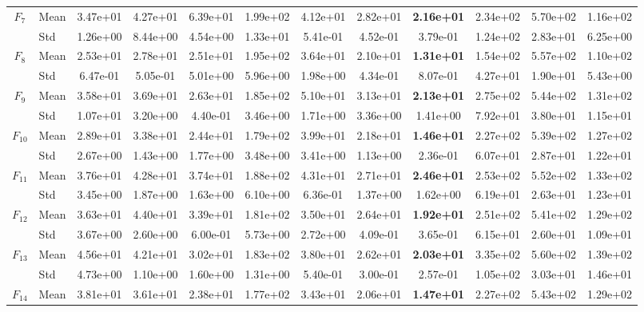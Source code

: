 \begin{center}
\begin{longtable}{clcccccccccc}
\midrule
$F_{7}$ & Mean & 3.47e+01 & 4.27e+01 & 6.39e+01 & 1.99e+02 & 4.12e+01 & 2.82e+01 & \textbf{2.16e+01} & 2.34e+02 & 5.70e+02 & 1.16e+02 \\
 & Std & 1.26e+00 & 8.44e+00 & 4.54e+00 & 1.33e+01 & 5.41e-01 & 4.52e-01 & 3.79e-01 & 1.24e+02 & 2.83e+01 & 6.25e+00 \\
\midrule
$F_{8}$ & Mean & 2.53e+01 & 2.78e+01 & 2.51e+01 & 1.95e+02 & 3.64e+01 & 2.10e+01 & \textbf{1.31e+01} & 1.54e+02 & 5.57e+02 & 1.10e+02 \\
 & Std & 6.47e-01 & 5.05e-01 & 5.01e+00 & 5.96e+00 & 1.98e+00 & 4.34e-01 & 8.07e-01 & 4.27e+01 & 1.90e+01 & 5.43e+00 \\
\midrule
$F_{9}$ & Mean & 3.58e+01 & 3.69e+01 & 2.63e+01 & 1.85e+02 & 5.10e+01 & 3.13e+01 & \textbf{2.13e+01} & 2.75e+02 & 5.44e+02 & 1.31e+02 \\
 & Std & 1.07e+01 & 3.20e+00 & 4.40e-01 & 3.46e+00 & 1.71e+00 & 3.36e+00 & 1.41e+00 & 7.92e+01 & 3.80e+01 & 1.15e+01 \\
\midrule
$F_{10}$ & Mean & 2.89e+01 & 3.38e+01 & 2.44e+01 & 1.79e+02 & 3.99e+01 & 2.18e+01 & \textbf{1.46e+01} & 2.27e+02 & 5.39e+02 & 1.27e+02 \\
 & Std & 2.67e+00 & 1.43e+00 & 1.77e+00 & 3.48e+00 & 3.41e+00 & 1.13e+00 & 2.36e-01 & 6.07e+01 & 2.87e+01 & 1.22e+01 \\
\midrule
$F_{11}$ & Mean & 3.76e+01 & 4.28e+01 & 3.74e+01 & 1.88e+02 & 4.31e+01 & 2.71e+01 & \textbf{2.46e+01} & 2.53e+02 & 5.52e+02 & 1.33e+02 \\
 & Std & 3.45e+00 & 1.87e+00 & 1.63e+00 & 6.10e+00 & 6.36e-01 & 1.37e+00 & 1.62e+00 & 6.19e+01 & 2.63e+01 & 1.23e+01 \\
\midrule
$F_{12}$ & Mean & 3.63e+01 & 4.40e+01 & 3.39e+01 & 1.81e+02 & 3.50e+01 & 2.64e+01 & \textbf{1.92e+01} & 2.51e+02 & 5.41e+02 & 1.29e+02 \\
 & Std & 3.67e+00 & 2.60e+00 & 6.00e-01 & 5.73e+00 & 2.72e+00 & 4.09e-01 & 3.65e-01 & 6.15e+01 & 2.60e+01 & 1.09e+01 \\
\midrule
$F_{13}$ & Mean & 4.56e+01 & 4.21e+01 & 3.02e+01 & 1.83e+02 & 3.80e+01 & 2.62e+01 & \textbf{2.03e+01} & 3.35e+02 & 5.60e+02 & 1.39e+02 \\
 & Std & 4.73e+00 & 1.10e+00 & 1.60e+00 & 1.31e+00 & 5.40e-01 & 3.00e-01 & 2.57e-01 & 1.05e+02 & 3.03e+01 & 1.46e+01 \\
\midrule
$F_{14}$ & Mean & 3.81e+01 & 3.61e+01 & 2.38e+01 & 1.77e+02 & 3.43e+01 & 2.06e+01 & \textbf{1.47e+01} & 2.27e+02 & 5.43e+02 & 1.29e+02 \\

\end{longtable}
\end{center}
